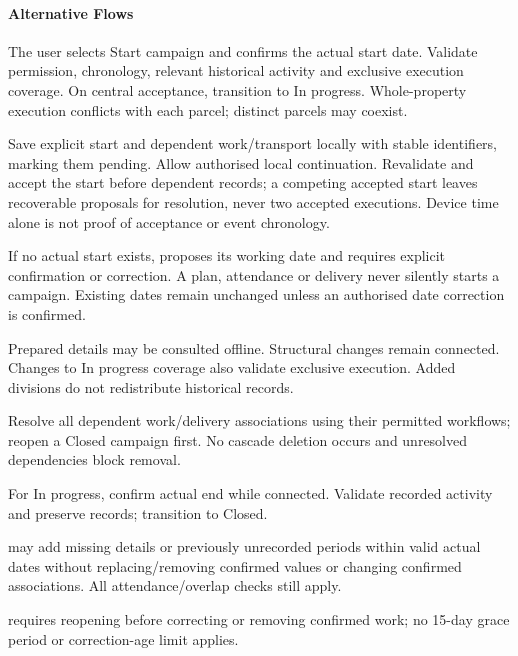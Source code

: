 \paragraph{Alternative Flows}
\begin{description}[style=nextline]
\item[A1 --- Explicit start.] The user selects Start campaign and confirms the
actual start date. Validate permission, chronology, relevant historical activity
and exclusive execution coverage. On central acceptance, transition to In progress.
Whole-property execution conflicts with each parcel; distinct parcels may coexist.
\item[A2 --- Offline start.] Save explicit start and dependent work/transport
locally with stable identifiers, marking them pending. Allow authorised local
continuation. Revalidate and accept the start before dependent records; a competing
accepted start leaves recoverable proposals for resolution, never two accepted
executions. Device time alone is not proof of acceptance or event chronology.
\item[A3 --- First actual assignment.] If no actual start exists,  proposes
its working date and requires explicit confirmation or correction. A plan,
attendance or delivery never silently starts a campaign. Existing dates remain
unchanged unless an authorised date correction is confirmed.
\item[A4 --- Consult/update.] Prepared details may be consulted offline. Structural
changes remain connected. Changes to In progress coverage also validate exclusive
execution. Added divisions do not redistribute historical records.
\item[A5 --- Remove coverage.] Resolve all dependent work/delivery associations
using their permitted workflows; reopen a Closed campaign first. No cascade deletion
occurs and unresolved dependencies block removal.
\item[A6 --- Close.] For In progress, confirm actual end while connected. Validate
recorded activity and preserve records; transition to Closed.
\item[A7 --- Complete missing work.]  may add missing details or previously
unrecorded periods within valid actual dates without replacing/removing confirmed
values or changing confirmed associations. All attendance/overlap checks still apply.
\item[A8 --- Correct confirmed work.]  requires reopening before correcting
or removing confirmed work; no 15-day grace period or correction-age limit applies.

\end{description}

